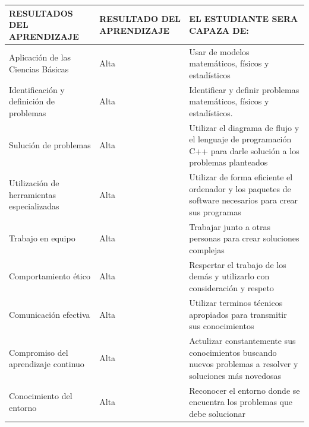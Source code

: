 \documentclass[a4pa<per,12pt,spanish]{article}
\begin{document}
\begin{tabular}[H]{|m{8cm}|m{3cm}|m{10cm}|}
  \hline
  \rowcolor{unidad7!50}
 
  RESULTADOS DEL APRENDIZAJE & RESULTADO DEL APRENDIZAJE  & EL ESTUDIANTE SERA CAPAZA DE: \\ \hline
Aplicación de las Ciencias Básicas   & Alta
                     & Usar de modelos matemáticos, físicos y estadísticos  \\ \hline
  Identificación y definición de problemas
                             & Alta
                     & Identificar y definir problemas matemáticos, físicos y estadísticos.  \\ \hline
  Sulución de problemas
                             & Alta
                     & Utilizar el diagrama de flujo y el lenguaje de programación C++ para darle solución a los problemas planteados  \\ \hline
  Utilización de herramientas especializadas
                             & Alta
                     & Utilizar de forma eficiente el ordenador y los paquetes de software  necesarios para crear sus programas  \\ \hline
  Trabajo en equipo
                             & Alta
                     & Trabajar junto a otras personas para crear soluciones complejas  \\ \hline
  Comportamiento ético
                             & Alta
                     & Respertar el trabajo de los demás y utilizarlo con consideración y respeto  \\ \hline
  Comunicación efectiva
                             & Alta
                     & Utilizar terminos técnicos apropiados para transmitir sus conocimientos  \\ \hline
  Compromiso del aprendizaje continuo
                             & Alta
                     & Actulizar constantemente sus conocimientos buscando nuevos problemas a resolver y soluciones más novedosas  \\ \hline
  Conocimiento del entorno
                             & Alta
                     & Reconocer el entorno donde se encuentra los problemas que debe solucionar  \\ \hline

\end{tabular}





\newpage




\restoregeometry
\end{document}
